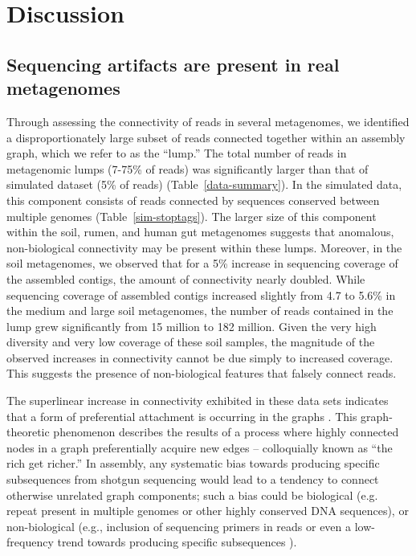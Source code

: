 \documentclass[10pt]{article}
\begin{document}
\section*{Discussion}

\subsection*{Sequencing artifacts are present in real metagenomes}

Through assessing the connectivity of reads in several metagenomes, we
identified a disproportionately large subset of reads
connected together within an assembly graph, which we refer to as
the ``lump.''
The total number of reads in
metagenomic lumps (7-75\% of reads) was significantly larger than that
of simulated dataset (5\% of reads) (Table~\ref{data-summary}).  In the simulated data,
this component consists
of reads connected by
sequences conserved between multiple genomes
(Table~\ref{sim-stoptags}). The larger size of this component
within the soil, rumen, and human gut metagenomes
suggests that anomalous, non-biological connectivity may be present
within these lumps.  Moreover, in the soil metagenomes, we
observed that for a 5\% increase in sequencing coverage of the assembled
contigs, the amount of connectivity nearly doubled.
While sequencing coverage of assembled contigs
increased slightly from 4.7 to 5.6\% in the medium and large soil
metagenomes, the number of reads contained in the lump grew
significantly from 15 million to 182 million.  Given the very high
diversity and very low coverage of these soil samples, the magnitude of the
observed increases in connectivity cannot be due simply to increased
coverage.  This suggests the presence of non-biological features
that falsely connect reads.

The superlinear increase in connectivity exhibited in these data sets
indicates that a form of preferential attachment is occurring in the
graphs \cite{Barabasi:1999p1083}.  This graph-theoretic phenomenon
describes the results of a process where highly connected nodes in a
graph preferentially acquire new edges -- colloquially known as ``the
rich get richer.''  In assembly, any systematic bias towards producing
specific subsequences from shotgun sequencing would lead to a tendency
to connect otherwise unrelated graph components; such a bias could be
biological (e.g. repeat present in multiple genomes or other
highly conserved DNA sequences), or non-biological (e.g., inclusion
of sequencing primers in reads or even a low-frequency trend towards
producing specific subsequences \cite{Hansen:2010if,Minoche:2011fl,Dohm:2008ky}).
\end{document}
